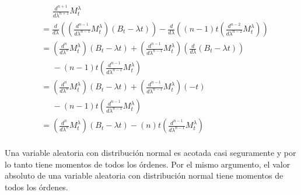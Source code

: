 \begin{align}
    &   \;\;\;\;\;\frac{d^{n+1}}{d\lambda^{n+1}}  M_t^\lambda                                                           \\
    &=  \frac{d}{d \lambda}\left(\left( \frac{d^{n-1}}{d\lambda^{n-1}} M_t^\lambda \right) (B_t - \lambda t)\right) - 
        \frac{d}{d \lambda}\left((n-1)t \left( \frac{d^{n-2}}{d\lambda^{n-2}} M_t^\lambda \right)\right)                \\
    &=  \left( \frac{d^{n}}{d\lambda^{n}} M_t^\lambda \right) (B_t - \lambda t) + 
        \left( \frac{d^{n-1}}{d\lambda^{n-1}} M_t^\lambda \right) \left(\frac{d}{d \lambda}(B_t - \lambda t)\right)     \\
    &   \;\;\;\;\;-(n-1)t \left( \frac{d^{n-1}}{d\lambda^{n-1}} M_t^\lambda \right)                                     \\
    &=  \left( \frac{d^{n}}{d\lambda^{n}} M_t^\lambda \right) (B_t - \lambda t) + 
        \left( \frac{d^{n-1}}{d\lambda^{n-1}} M_t^\lambda \right) (-t)                                                  \\
    &   \;\;\;\;\;-(n-1)t \left( \frac{d^{n-1}}{d\lambda^{n-1}} M_t^\lambda \right)                                     \\
    &=  \left( \frac{d^{n}}{d\lambda^{n}} M_t^\lambda \right) (B_t - \lambda t) - (n)t \left( \frac{d^{n-1}}{d\lambda^{n-1}} M_t^\lambda \right)                                     \\
\end{align}\pn

Una variable aleatoria con distribución normal es acotada casi seguramente y 
por lo tanto tiene momentos de todos los órdenes. Por el mismo argumento, el valor 
absoluto de una variable aleatoria con distribución normal tiene momentos de todos los
órdenes.

